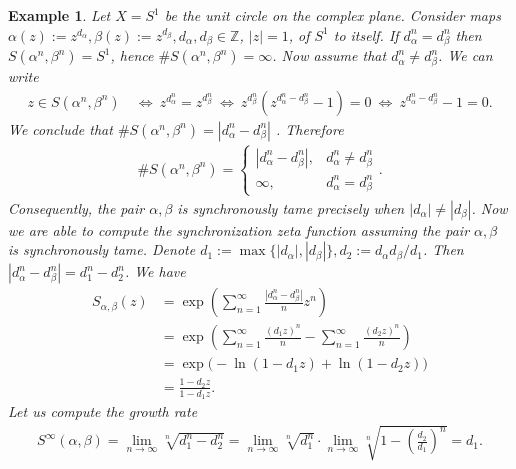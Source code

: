 \documentclass[oneside]{amsart}
\def\Z{\mathbb{Z}}
\newtheorem{ex}[thm]{Example}
\begin{document}
\begin{ex} \label{ex:synchronization-on-T1}
  Let $X = S^1$ be the unit circle on the complex plane.
   Consider maps $\alpha(z) := z^{d_\alpha}, \beta(z) := z^{d_\beta}, d_\alpha, d_\beta \in \Z$, $|z| = 1$, of $S^1$ to itself.
  If $d_\alpha^n = d_\beta^n$ then $S(\alpha^n, \beta^n) = S^1$, hence $\# S(\alpha^n, \beta^n) = \infty$.
  Now assume that $d_\alpha^n \neq d_\beta^n$. We can write
  \begin{align*}
    z \in S(\alpha^n, \beta^n) \ &\Leftrightarrow \ z^{d_\alpha^n} = z^{d_\beta^n}
      \ \Leftrightarrow \ z^{d_\beta^n} \left( z^{d_\alpha^n - d_\beta^n} - 1 \right) = 0
      \ \Leftrightarrow \  z^{d_\alpha^n - d_\beta^n} - 1 = 0.
  \end{align*}
  We conclude that  $  \# S(\alpha^n, \beta^n) =|d_\alpha^n - d_\beta^n|$ .
  Therefore
  \begin{align*}
    \# S(\alpha^n, \beta^n) = \begin{cases}
      |d_\alpha^n - d_\beta^n|, & d_\alpha^n \neq d_\beta^n \\
      \infty, & d_\alpha^n = d_\beta^n
    \end{cases}.
  \end{align*}
  Consequently, the pair $\alpha, \beta$  is  synchronously tame precisely when $|d_\alpha| \neq |d_\beta|$.
  Now we are able to compute the synchronization zeta function assuming the pair $\alpha, \beta$ is  synchronously tame.
  Denote $d_1 := \max \{ |d_\alpha|, |d_\beta| \}, d_2 := d_\alpha d_\beta / d_1$.
  Then  $|d_\alpha^n - d_\beta^n| = d_1^n - d_2^n$.
  We have
  \begin{align*}
    S_{\alpha, \beta}(z) &= \exp \left( \sum_{n=1}^\infty \frac{|d_\alpha^n - d_\beta^n|}{n} z^n \right) \\
    &= \exp \left( \sum_{n=1}^\infty \frac{(d_1 z)^n}{n} - \sum_{n=1}^\infty \frac{(d_2 z)^n}{n} \right) \\
    &= \exp \big( -\ln (1 - d_1 z) + \ln (1 - d_2 z) \big) \\
    &= \frac{1 - d_2 z}{1 - d_1 z}.
  \end{align*}
  Let us compute the growth rate
  \begin{align*}
    S^\infty(\alpha, \beta) = \lim_{n \to \infty} \sqrt[n]{d_1^n - d_2^n}
      = \lim_{n \to \infty} \sqrt[n]{d_1^n} \cdot \lim_{n \to \infty} \sqrt[n]{1 - \left( \frac{d_2}{d_1} \right)^n}
      = d_1.
  \end{align*}
\end{ex}
\end{document}
